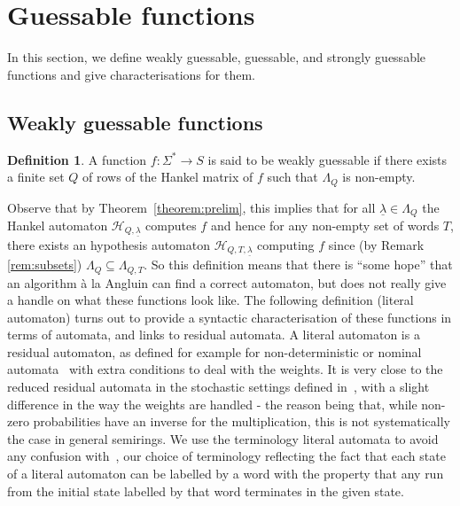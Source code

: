 \documentclass[10pt,a4paper]{amsart}
\theoremstyle{definition}
\newtheorem{defi}[thm]{Definition}
\numberwithin{equation}{section}
\numberwithin{theorem}{section}
\begin{document}
\section{Guessable functions}
\label{section:guessable}

In this section, we define weakly guessable,  guessable, and strongly guessable functions and give characterisations for them.

\subsection{Weakly guessable functions}

\begin{defi}
\label{definition:weakly}
A function $f: \Sigma^* \rightarrow S$ is said to be weakly guessable if there exists a finite set $Q$ of rows of the Hankel matrix of $f$ such that $\Lambda_Q$ is non-empty. 
\end{defi}

Observe that by Theorem~\ref{theorem:prelim}, this implies that for all $\underline{\lambda} \in \Lambda_Q$ the Hankel automaton $\mathcal{H}_{Q,\underline{\lambda}}$ computes $f$ and hence for any non-empty set of words $T$, there exists an hypothesis automaton $\mathcal{H}_{Q,T,\underline{\lambda}}$ computing $f$ since (by Remark \ref{rem:subsets}) $\Lambda_Q \subseteq \Lambda_{Q,T}$. So this definition means that there is ``some hope'' that an algorithm \`a la Angluin can find a correct automaton, but does not really give a handle on what these functions look like. The following definition (literal automaton) turns out to provide a syntactic characterisation of these functions in terms of automata, and links to residual automata. A literal automaton is a residual automaton, as defined for example for non-deterministic or nominal automata~\cite{GGV20,MS22} with extra conditions to deal with the weights. It is very close to the reduced residual automata in the stochastic settings defined in~\cite{DE08}, with a slight difference in the way the weights are handled - the reason being that, while non-zero probabilities have an inverse for the multiplication, this is not systematically the case in general semirings. We use the terminology literal automata to avoid any confusion with~\cite{DE08}, our choice of terminology reflecting the fact that each state of a literal automaton can be labelled by a word with the property that any run from the initial state labelled by that word terminates in the given state.
\end{document}
